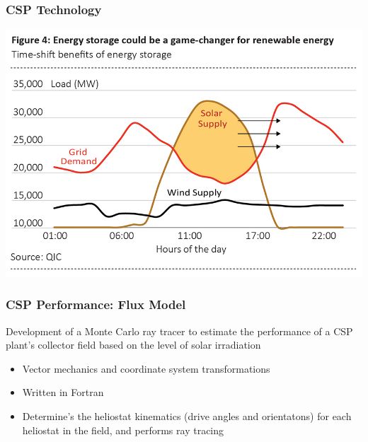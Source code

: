\documentclass[aspectratio=169]{beamer}
\begin{document}
\begin{frame}
  \frametitle{CSP Technology}
  \includegraphics[width=0.75\linewidth]{SolarEnergyStorage.jpg}
\end{frame}

\begin{frame}
  \frametitle{CSP Performance: Flux Model}
  Development of a Monte Carlo ray tracer to estimate the performance
  of a CSP plant's collector field based on the level of solar
  irradiation

  \begin{itemize}
  \item Vector mechanics and coordinate system transformations
  \item Written in Fortran
  \item Determine's the heliostat kinematics (drive angles and
    orientatons) for each heliostat in the field, and performs ray
    tracing
  \end{itemize}  
\end{frame}


\end{document}
